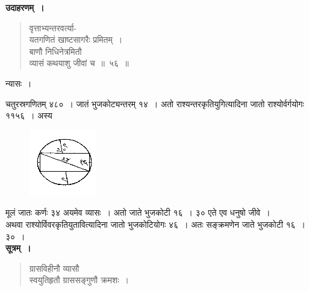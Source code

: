 \documentclass[11pt, openany]{book}
\begin{document}
\newpage

 \textbf{उदाहरणम्~।} 
\begin{quote}
    \bqt 
     वृत्ताभ्यन्तरवर्त्या-\\
     यतगणितं खाष्टसागरैः प्रमितम्~।\\
बाणौ निधिनेत्रमितौ \\
व्यासं कथयाशु जीवां च~॥~५६~॥
\end{quote}

 न्यासः~। \\
 \vspace{-4mm}

 चतुरस्रगणितम् ४८०~। जातं भुजकोट्यन्तरम् १४~। अतो
राश्यन्तरकृतियुगित्यादिना जातो राश्योर्वर्गयोगः ११५६~। अस्य
 \vspace{-2mm}

\begin{figure}[h!]
    \centering
    \includegraphics[scale=0.85]{graphics/capture79.png}
\end{figure}
 \vspace{-2mm}

\noindent मूलं जातः कर्णः ३४ अयमेव व्यासः~। अतो जाते भुजकोटी १६~। ३० एते एव धनुषो जीवे~। \\

\vspace{-4mm}
अथवा राश्योर्विवरकृतियुतावित्यादिना जातो भुजकोटियोगः
४६~। अतः सङ्क्रमणेन जाते भुजकोटी १६~। ३०~। \\

 \textbf{सूत्रम्~।} 
\begin{quote}
    \bs 
     ग्रासविहीनौ व्यासौ \\
     स्वयुतिहृतौ ग्राससङ्गुणौ क्रमशः~।
\end{quote}

\newpage%
\end{document}
